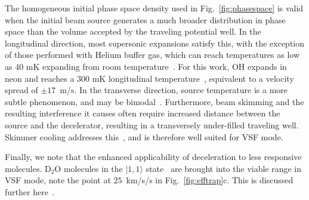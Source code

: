 \documentclass[%
 reprint,
 amsmath,amssymb,
 aps,
prl,
]{revtex4-1}
\begin{document}

The homogeneous initial phase space density used in Fig.~\ref{fig:phasespace} is valid when the initial beam source generates a much broader distribution in phase space than the volume accepted by the traveling potential well.
In the longitudinal direction, most supersonic expansions satisfy this, with the exception of those performed with Helium buffer gas, which can reach temperatures as low as $40\text{ mK}$ expanding from room temperature~\cite{Even2014}.
For this work, OH expands in neon and reaches a $300\text{ mK}$ longitudinal temperature~\cite{Wu2018}, equivalent to a velocity spread of $\pm17$~m/s.
In the transverse direction, source temperature is a more subtle phenomenon, and may be bimodal~\cite{Beijerinck1981}.
Furthermore, beam skimming and the resulting interference it causes often require increased distance between the source and the decelerator, resulting in a transversely under-filled traveling well.
Skimmer cooling addresses this~\cite{Wu2018}, and is therefore well suited for VSF mode.

Finally, we note that the enhanced applicability of deceleration to less responsive molecules.
D$_2$O molecules in the $|1,1\rangle$ state~\cite{Motsch2009} are brought into the viable range in VSF mode, note the point at $25$~km/s/s in Fig.~\ref{fig:efftrap}c.
This is discussed further here~\cite{ssm}.
\end{document}
